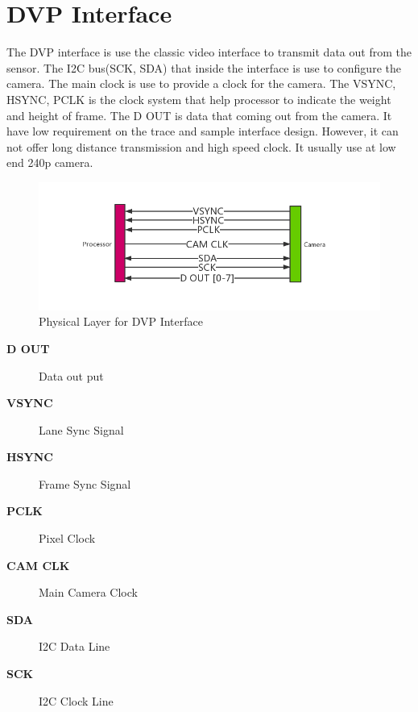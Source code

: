 \documentclass[12pt,article]{memoir}
\begin{document}
\section{DVP Interface} 
The DVP interface is use the classic video interface to transmit data out from the sensor. The I2C bus(SCK, SDA) that inside the interface is use to configure the camera. The main clock is use to provide a clock for the camera. The VSYNC, HSYNC, PCLK is the clock system that help processor to indicate the weight and height of frame. The D OUT is data that coming out from the camera. It have low requirement on the trace and sample interface design. However, it can not offer long distance transmission and high speed clock. It usually use at low end 240p camera.\cite{blog:DVP}
\begin{figure}[htp]
\includegraphics[width=\textwidth]{img/DR00002_DVP.png}
 \caption{Physical Layer for DVP Interface}	
\end{figure}
\begin{description}
	\item[\textbf{D OUT}]Data out put
	\item[\textbf{VSYNC}]Lane Sync Signal
	\item[\textbf{HSYNC}]Frame Sync Signal
	\item[\textbf{PCLK}]Pixel Clock
	\item[\textbf{CAM CLK}]Main Camera Clock
	\item[\textbf{SDA}]I2C Data Line
	\item[\textbf{SCK}]I2C Clock Line
\end{description}
\newpage
\end{document}
